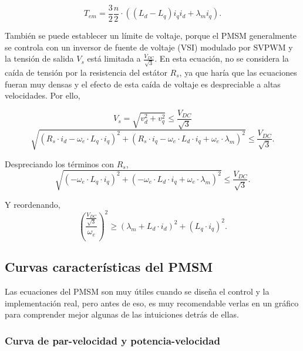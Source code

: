 \begin{equation}
T_{em} = \frac{3}{2}\frac{n}{2}\cdot((L_d - L_q) i_q i_d + \lambda_m i_q) \text{.}
\label{eq_tq_dq} 
\end{equation}

También se puede establecer un límite de voltaje, porque el PMSM generalmente se controla con un inversor de fuente de voltaje (VSI) modulado por SVPWM y la tensión de salida $V_s$ está limitada a \(\frac{V_{DC}}{\sqrt{3}}\). En esta ecuación, no se considera la caída de tensión por la resistencia del estátor \(R_s\), ya que haría que las ecuaciones fueran muy densas y el efecto de esta caída de voltaje es despreciable a altas velocidades. Por ello,

\begin{equation}
V_s = \sqrt{v_d^2 + v_q^2} \leq \frac{V_{DC}}{\sqrt{3}}
\end{equation}
\begin{equation}
	\sqrt{\left(R_s\cdot i_d - \omega_e \cdot L_q \cdot i_q\right)^2 + \left(R_s\cdot i_q - \omega_e \cdot L_d \cdot i_q + \omega_e \cdot \lambda_m\right)^2} \leq \frac{V_{DC}}{\sqrt{3}} \text{.}
\end{equation}

Despreciando los términos con \(R_s\),
\begin{equation}
	\sqrt{\left(- \omega_e \cdot L_q \cdot i_q\right)^2 + \left(- \omega_e \cdot L_d \cdot i_q + \omega_e \cdot \lambda_m\right)^2} \leq \frac{V_{DC}}{\sqrt{3}} \text{.}
\end{equation}
 
Y reordenando,
\begin{equation}
	\left(\frac{\frac{V_{DC}}{\sqrt{3}}}{\omega_e}\right)^2 \geq \left(\lambda_m+L_d\cdot i_d\right)^2+(L_q\cdot i_q)^2 \text{.}
	\label{eq_vle_dq}
\end{equation}

\subsection{Curvas características del PMSM}

Las ecuaciones del PMSM son muy útiles cuando se diseña el control y la implementación real, pero antes de eso, es muy recomendable verlas en un gráfico para comprender mejor algunas de las intuiciones detrás de ellas.

\subsubsection{Curva de par-velocidad y potencia-velocidad}

